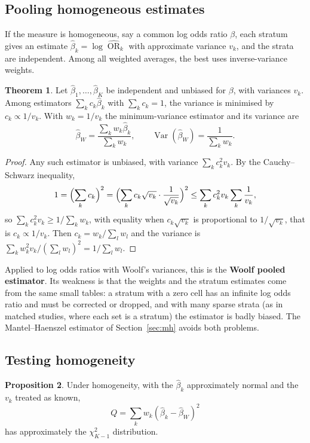 \documentclass[11pt,a4paper]{article}
\numberwithin{equation}{section}
\DeclareMathOperator{\Var}{Var}
\DeclareMathOperator{\OR}{OR}
\theoremstyle{definition}
\newtheorem{thm}{Theorem}[subsection]
\newtheorem{prop}[thm]{Proposition}
\begin{document}
\subsection{Pooling homogeneous estimates}
\label{sec:pooling}

If the measure is homogeneous, say a common log odds ratio $\beta$, each stratum gives an estimate $\hat\beta_k = \log\widehat{\OR}_k$ with approximate
variance $v_k$, and the strata are independent. Among all weighted averages, the best uses inverse-variance weights.

\begin{thm}
\label{thm:ivw}
Let $\hat\beta_1, \dots, \hat\beta_K$ be independent and unbiased for $\beta$, with variances $v_k$. Among estimators $\sum_k c_k\hat\beta_k$ with $\sum_k c_k = 1$, the variance is
minimised by $c_k \propto 1/v_k$. With $w_k = 1/v_k$ the minimum-variance estimator and its variance are
\[
\hat\beta_W = \frac{\sum_k w_k\hat\beta_k}{\sum_k w_k}, \qquad \Var(\hat\beta_W) = \frac{1}{\sum_k w_k} .
\]
\end{thm}

\begin{proof}
Any such estimator is unbiased, with variance $\sum_k c_k^2 v_k$. By the Cauchy--Schwarz inequality,
\[
1 = \Bigl(\sum_k c_k\Bigr)^2 = \Bigl(\sum_k c_k\sqrt{v_k} \cdot \frac{1}{\sqrt{v_k}}\Bigr)^2 \leq \sum_k c_k^2 v_k \sum_k \frac{1}{v_k} ,
\]
so $\sum_k c_k^2 v_k \geq 1/\sum_k w_k$, with equality when $c_k\sqrt{v_k}$ is proportional to $1/\sqrt{v_k}$, that is $c_k \propto 1/v_k$. Then $c_k = w_k/\sum_l w_l$ and the variance is
$\sum_k w_k^2 v_k/(\sum_l w_l)^2 = 1/\sum_l w_l$.
\end{proof}

Applied to log odds ratios with Woolf's variances, this is the \textbf{Woolf pooled estimator}. Its weakness is that the weights and the
stratum estimates come from the same small tables: a stratum with a zero cell has an infinite log odds ratio and must be corrected or
dropped, and with many sparse strata (as in matched studies, where each set is a stratum) the estimator is badly biased. The
Mantel--Haenszel estimator of Section~\ref{sec:mh} avoids both problems.

\subsection{Testing homogeneity}

\begin{prop}
\label{prop:woolfq}
Under homogeneity, with the $\hat\beta_k$ approximately normal and the $v_k$ treated as known,
\[
Q = \sum_k w_k(\hat\beta_k - \hat\beta_W)^2
\]
has approximately the $\chi^2_{K - 1}$ distribution.
\end{prop}
\end{document}
